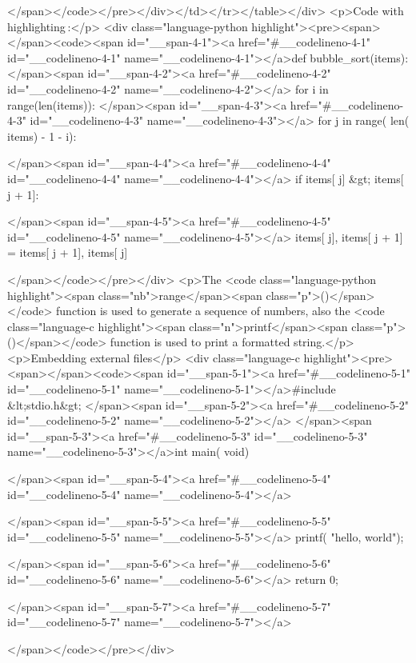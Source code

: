 </span></code></pre></div></td></tr></table></div>
<p>Code with highlighting :</p>
<div class="language-python highlight"><pre><span></span><code><span id="__span-4-1"><a href="#__codelineno-4-1" id="__codelineno-4-1" name="__codelineno-4-1"></a>def bubble_sort(items):
</span><span id="__span-4-2"><a href="#__codelineno-4-2" id="__codelineno-4-2" name="__codelineno-4-2"></a>    for i in range(len(items)):
</span><span id="__span-4-3"><a href="#__codelineno-4-3" id="__codelineno-4-3" name="__codelineno-4-3"></a>        for j in range(
len(
items)
 - 1 - i):

</span><span id="__span-4-4"><a href="#__codelineno-4-4" id="__codelineno-4-4" name="__codelineno-4-4"></a>            if items[
j]
 &gt; items[
j + 1]:

</span><span id="__span-4-5"><a href="#__codelineno-4-5" id="__codelineno-4-5" name="__codelineno-4-5"></a>                items[
j],
 items[
j + 1]
 = items[
j + 1],
 items[
j]

</span></code></pre></div>
<p>The <code class="language-python highlight"><span class="nb">range</span><span class="p">()</span></code> function is used to generate a sequence of numbers, also the <code class="language-c highlight"><span class="n">printf</span><span class="p">()</span></code> function is used to print a formatted string.</p>
<p>Embedding external files</p>
<div class="language-c highlight"><pre><span></span><code><span id="__span-5-1"><a href="#__codelineno-5-1" id="__codelineno-5-1" name="__codelineno-5-1"></a>#include &lt;stdio.h&gt;
</span><span id="__span-5-2"><a href="#__codelineno-5-2" id="__codelineno-5-2" name="__codelineno-5-2"></a>
</span><span id="__span-5-3"><a href="#__codelineno-5-3" id="__codelineno-5-3" name="__codelineno-5-3"></a>int main(
void)

</span><span id="__span-5-4"><a href="#__codelineno-5-4" id="__codelineno-5-4" name="__codelineno-5-4"></a>{

</span><span id="__span-5-5"><a href="#__codelineno-5-5" id="__codelineno-5-5" name="__codelineno-5-5"></a>    printf(
"hello, world\n");

</span><span id="__span-5-6"><a href="#__codelineno-5-6" id="__codelineno-5-6" name="__codelineno-5-6"></a>    return 0;

</span><span id="__span-5-7"><a href="#__codelineno-5-7" id="__codelineno-5-7" name="__codelineno-5-7"></a>}

</span></code></pre></div>
